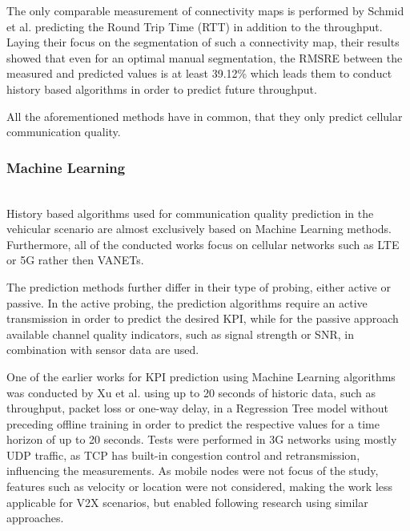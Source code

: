 \documentclass[conference]{IEEEtran}
\begin{document}
The only comparable measurement of connectivity maps is performed by Schmid et al. \cite{schmidPassiveMonitoringGeobased2018} predicting the Round Trip Time (RTT) in addition to the throughput. Laying their focus on the segmentation of such a connectivity map, their results showed that even for an optimal manual segmentation, the RMSRE between the measured and predicted values is at least 39.12\% which leads them to conduct history based algorithms in order to predict future throughput.

All the aforementioned methods have in common, that they only predict cellular communication quality. 
\\
\subsubsection{Machine Learning}\mbox{}\\
History based algorithms used for communication quality prediction in the vehicular scenario are almost exclusively based on Machine Learning methods. Furthermore, all of the conducted works focus on cellular networks such as LTE or 5G rather then VANETs.

The prediction methods further differ in their type of probing, either active or passive. In the active probing, the prediction algorithms require an active transmission in order to predict the desired KPI, while for the passive approach available channel quality indicators, such as signal strength or SNR, in combination with sensor data are used.

One of the earlier works for KPI prediction using Machine Learning algorithms was conducted by Xu et al. \cite{xuPROTEUSNetworkPerformance2013} using up to 20 seconds of historic data, such as throughput, packet loss or one-way delay, in a Regression Tree model without preceding offline training in order to predict the respective values for a time horizon of up to 20 seconds. Tests were performed in 3G networks using mostly UDP traffic, as TCP has built-in congestion control and retransmission, influencing the measurements. As mobile nodes were not focus of the study, features such as velocity or location were not considered, making the work less applicable for V2X scenarios, but enabled following research using similar approaches.
\end{document}

